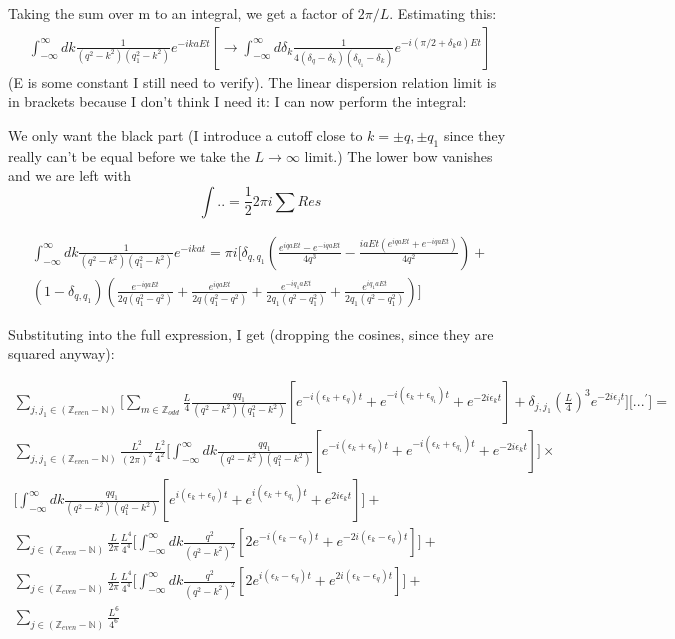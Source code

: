 \documentclass[a4paper]{article}
\begin{document}
Taking the sum over m to an integral, we get a factor of $2\pi/L$. Estimating this:
\begin{gather*}
\int_{-\infty}^{\infty}dk \frac{1}{(q^2 - k^2)(q_1^2 - k^2)}e^{-i k a E t} [\rightarrow
\int_{-\infty}^{\infty}d\delta_k \frac{1}{4(\delta_q - \delta_k)(\delta_{q_1} - \delta_k)}e^{-i (\pi/2 + \delta_k a)E t}]
\end{gather*} 
(E is some constant I still need to verify).\newline
The linear dispersion relation limit is in brackets because I don't think I need it: I can now perform the integral:


We only want the black part (I introduce a cutoff close to $k = \pm q, \pm q_1$ since they really can't be equal before we take the $L\rightarrow\infty$ limit.) The lower bow vanishes and we are left with 
\[ \int .. = \frac{1}{2}2 \pi i \sum Res  \]

\begin{gather*}
\int_{-\infty}^{\infty}dk \frac{1}{(q^2 - k^2)(q_1^2 - k^2)}e^{-i k a t} = \pi i \big[ \delta_{q, q_1} (\frac{e^{iqaEt} - e^{-iqaEt}}{4q^3} - \frac{iaEt(e^{iqaEt} + e^{-iqaEt})}{4q^2}) + \\
(1 - \delta_{q, q_1})(\frac{e^{-iqaEt}}{2q(q_1^2 - q^2)} + \frac{e^{iqaEt}}{2q(q_1^2 - q^2)} + \frac{e^{-iq_1aEt}}{2q_1(q^2 - q_1^2)} + \frac{e^{iq_1aEt}}{2q_1(q^2 - q_1^2)})
\big]
\end{gather*} 

Substituting into the full expression, I get (dropping the cosines, since they are squared anyway):

\begin{gather*}
\sum_{j, j_1 \in (\mathbb{Z}_{even} - \mathbb{N})}
\big[ \sum_{m \in \mathbb{Z}_{odd}} \frac{L}{4} \frac{qq_1}{(q^2 - k^2)(q_1^2 - k^2)}[e^{-i(\epsilon_k + \epsilon_q)t} + e^{-i(\epsilon_k + \epsilon_{q_1})t} + e^{-2i\epsilon_k t}] 
+ \delta_{j, j_1}(\frac{L}{4})^3 e^{-2i\epsilon_j t} 
\big] \big[...^\prime\big] = \\
\sum_{j, j_1 \in (\mathbb{Z}_{even} - \mathbb{N})}\frac{L^2}{(2\pi)^2} \frac{L^2}{4^2}\big[\int_{-\infty}^{\infty} dk \frac{qq_1}{(q^2 - k^2)(q_1^2 - k^2)}[e^{-i(\epsilon_k + \epsilon_q)t} + e^{-i(\epsilon_k + \epsilon_{q_1})t} + e^{-2i\epsilon_k t}] \big] \times \\
\big[\int_{-\infty}^{\infty} dk \frac{qq_1}{(q^2 - k^2)(q_1^2 - k^2)}[e^{i(\epsilon_k + \epsilon_q)t} + e^{i(\epsilon_k + \epsilon_{q_1})t} + e^{2i\epsilon_k t}] \big] + \\
\sum_{j \in (\mathbb{Z}_{even} - \mathbb{N})} \frac{L}{2\pi}\frac{L^4}{4^4}\big[\int_{-\infty}^{\infty} dk \frac{q^2}{(q^2 - k^2)^2}[2e^{-i(\epsilon_k - \epsilon_q)t}  + e^{-2i(\epsilon_k -\epsilon_q)t}] \big] + \\
\sum_{j \in (\mathbb{Z}_{even} - \mathbb{N})} \frac{L}{2\pi}\frac{L^4}{4^4}\big[\int_{-\infty}^{\infty} dk \frac{q^2}{(q^2 - k^2)^2}[2e^{i(\epsilon_k - \epsilon_q)t}  + e^{2i(\epsilon_k -\epsilon_q)t}] \big] + \\
\sum_{j \in (\mathbb{Z}_{even} - \mathbb{N})} \frac{L^6}{4^6}
\end{gather*}
\end{document}
